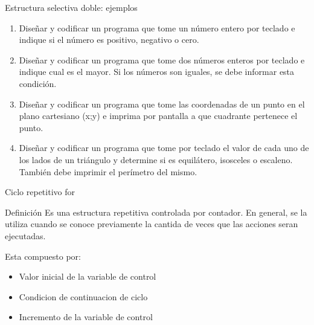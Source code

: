 \documentclass[xcolor=pdftex,table,11pt]{beamer}
\begin{document}
\begin{frame}{Estructura selectiva doble: ejemplos}
 \begin{enumerate}
   
     	\item Diseñar y codificar un programa que tome un número entero por teclado e indique si el número es positivo, negativo o cero.     	
\href{https://github.com/danis963/informaticaI_IUA/blob/main/c/src/2-2_if_else.c}{}



     	\item Diseñar y codificar un programa que tome dos números enteros por teclado e indique cual es el mayor. Si los números son iguales, se debe informar esta condición.
     	
	\href{https://github.com/danis963/informaticaI_IUA/blob/main/c/src/2-3_if_else.c}{}

     	\item Diseñar y codificar un programa que tome las coordenadas de un punto en el plano cartesiano (x;y) e imprima por pantalla a que cuadrante pertenece el punto.


	\href{https://github.com/danis963/informaticaI_IUA/blob/main/c/src/2-4_if_else.c}{}
   
   
   
       \item Diseñar y codificar un programa que tome por teclado el valor de cada uno de los lados de un triángulo y determine si es equilátero, isosceles o escaleno. También debe imprimir el perímetro del mismo.


	\href{https://github.com/danis963/informaticaI_IUA/blob/main/c/src/2-5_if_else.c}{}
   \end{enumerate}
   

\end{frame}

\begin{frame}{Ciclo repetitivo for}

\begin{block}{Definición}
Es una estructura repetitiva controlada por contador. En general, se la utiliza cuando se conoce previamente la cantida de veces que las acciones seran ejecutadas.
\end{block}

Esta compuesto por:

\begin{itemize}
\item Valor inicial de la variable de control
\item Condicion de continuacion de ciclo
\item Incremento de la variable de control
\end{itemize}

\end{frame}
\end{document}
